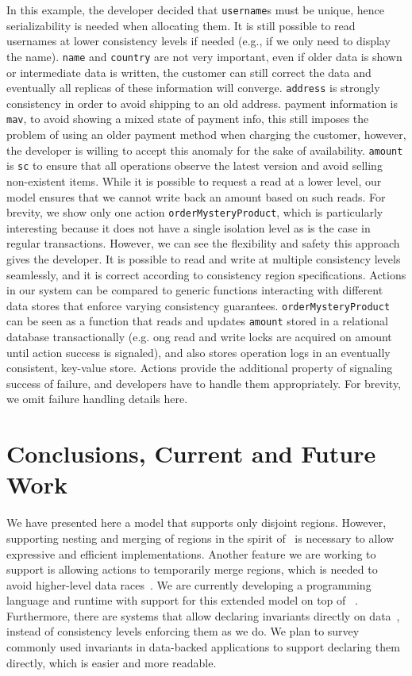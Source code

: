 \documentclass[preprint,numbers]{sigplanconf}
\begin{document}
In this example, 
the developer 
decided that \texttt{username}s must be unique, hence serializability is needed
when allocating them. It is still possible to read usernames at lower
consistency levels if needed (e.g., if we only need to display the name). \texttt{name} and \texttt{country} are not very important, even if older
data is shown or intermediate data is written, the customer can still correct
the data and eventually all replicas of these information will converge.
\texttt{address} is strongly consistency in order to avoid shipping to an old address.
payment information is \texttt{mav}, to avoid showing a mixed state of payment info, this still
imposes the problem of using an older payment method when charging the customer,
however, the developer is willing to accept this anomaly for the sake of
availability. \texttt{amount} is \texttt{sc} to ensure that all operations
observe the latest version and avoid selling non-existent items. While it is possible to request a read at a lower
level, our model ensures that we cannot write back an amount based on such reads. For brevity,
we show only one action \texttt{orderMysteryProduct}, which is particularly interesting because it does
not have a single isolation level as is the case in regular transactions.
However, we can see the flexibility and safety this approach gives the
developer. It is possible to read and write at multiple consistency levels
seamlessly, and it is correct according to consistency region specifications.
Actions in our system can be compared to generic functions interacting
with different data stores that enforce varying consistency guarantees.
\texttt{orderMysteryProduct}  can be seen as a function that
reads and updates \texttt{amount} stored in a relational database
transactionally (e.g. ong read and write locks are acquired on amount until
action success is signaled), and also stores operation logs in an eventually consistent,
key-value store. Actions provide the additional property of signaling success
of failure, and developers have to handle them appropriately. For brevity, we omit failure handling details here.

\section{Conclusions, Current and  Future Work}
We have presented here a model that supports only disjoint regions. However, supporting
nesting and merging of regions in the spirit of~\cite{dolby2012data} is necessary to allow expressive and efficient 
implementations. Another feature we are working to support is allowing actions to temporarily merge regions, which
is needed to avoid higher-level data races~\cite{artho2003high}. We are
currently developing a programming language and runtime with support for this extended model
on top of ~\cite{burckhardt2012cloud}. Furthermore, there are systems
that allow declaring invariants directly on data~\cite{bailis2015feral}, instead of 
consistency levels enforcing them as we do. We plan to survey commonly used
invariants in data-backed applications to support declaring them directly, which
is easier and more readable.








\end{document}
